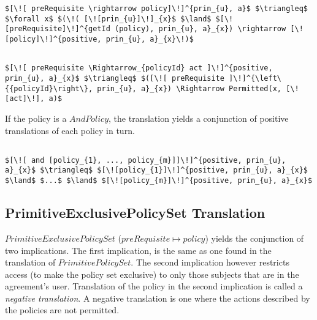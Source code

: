 \lstset{mathescape, language=AST}  
\begin{lstlisting}[frame=single, caption={Policy Set Translation {$\colon$} PrimitivePolicySet},label={lst:transpolicyformulaPrimitivePolicySet}]
$[\![ preRequisite \rightarrow policy]\!]^{prin_{u}, a}$ $\triangleq$ $\forall x$ $(\!( [\![prin_{u}]\!]_{x}$ $\land$ $[\![preRequisite]\!]^{getId (policy), prin_{u}, a}_{x}) \rightarrow [\![policy]\!]^{positive, prin_{u}, a}_{x}\!)$
\end{lstlisting}



\lstset{mathescape, language=AST} 
\begin{lstlisting}[frame=single, caption={Positive Policy Translation {$\colon$} Single policy},label={lst:transpolicypositiveSingle}]

$[\![ preRequisite \Rightarrow_{policyId} act ]\!]^{positive, prin_{u}, a}_{x}$ $\triangleq$ $([\![ preRequisite ]\!]^{\left\{{policyId}\right\}, prin_{u}, a}_{x}) \Rightarrow Permitted(x, [\![act]\!], a)$

\end{lstlisting}


If the policy is a $AndPolicy$, the translation yields a conjunction of positive translations of each policy in turn.

\lstset{mathescape, language=AST}  
\begin{lstlisting}[frame=single, caption={Positive Policy Translation {$\colon$} List of policies},label={lst:transpolicypositiveListOfPolicies}]

$[\![ and [policy_{1}, ..., policy_{m}]]\!]^{positive, prin_{u}, a}_{x}$ $\triangleq$ $[\![policy_{1}]\!]^{positive, prin_{u}, a}_{x}$ $\land$ $...$ $\land$ $[\![policy_{m}]\!]^{positive, prin_{u}, a}_{x}$

\end{lstlisting}


\subsection{PrimitiveExclusivePolicySet Translation}
$PrimitiveExclusivePolicySet$ ($preRequisite \mapsto policy$) yields the conjunction of two implications. The first implication, is the same as one found in the translation of $PrimitivePolicySet$. The second implication however restricts access (to make the policy set exclusive) to only those subjects that are in the agreement's user. Translation of the policy in the second implication is called a \emph{negative translation}. A negative translation is one where the actions described by the policies are not permitted. 


